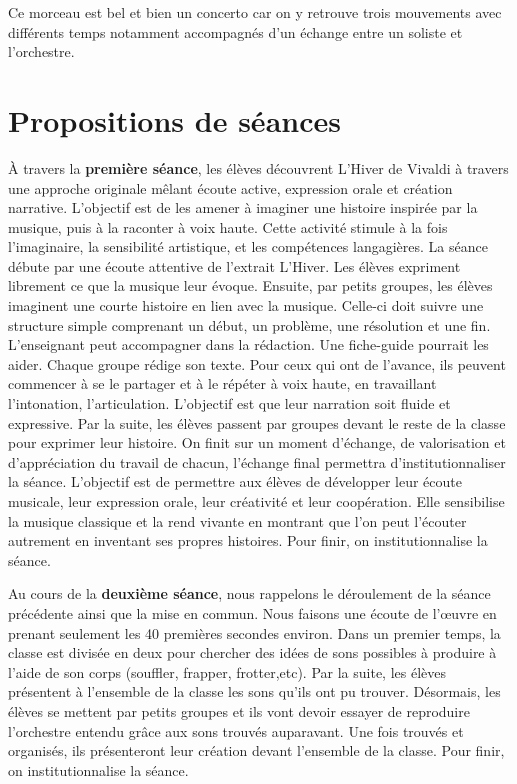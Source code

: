 \documentclass[12pt]{article}
\begin{document}
Ce morceau est bel et bien un concerto car on y retrouve trois mouvements avec différents temps notamment accompagnés d’un échange entre un soliste et l’orchestre.



\section{Propositions de séances}

À travers la \textbf{première séance}, les élèves découvrent L’Hiver de Vivaldi à travers une approche originale mêlant écoute active, expression orale et création narrative. L’objectif est de les amener à imaginer une histoire inspirée par la musique, puis à la raconter à voix haute. Cette activité stimule à la fois l’imaginaire, la sensibilité artistique, et les compétences langagières. 
La séance débute par une écoute attentive de l’extrait L’Hiver. Les élèves expriment librement ce que la musique leur évoque. Ensuite, par petits groupes, les élèves imaginent une courte histoire en lien avec la musique. Celle-ci doit suivre une structure simple comprenant un début, un problème, une résolution et une fin. L’enseignant peut accompagner dans la rédaction. Une fiche-guide pourrait les aider. Chaque groupe rédige son texte. Pour ceux qui ont de l’avance, ils peuvent commencer à se le partager et à le répéter à voix haute, en travaillant l’intonation, l’articulation. L’objectif est que leur narration soit fluide et expressive. Par la suite, les élèves passent par groupes devant le reste de la classe pour exprimer leur histoire. On finit sur un moment d’échange, de valorisation et d’appréciation du travail de chacun, l’échange final permettra d’institutionnaliser la séance. L’objectif est de permettre aux élèves de développer leur écoute musicale, leur expression orale, leur créativité et leur coopération. Elle sensibilise la musique classique et la rend vivante en montrant que l’on peut l’écouter autrement en inventant ses propres histoires. Pour finir, on institutionnalise la séance.

Au cours de la \textbf{deuxième séance}, nous rappelons le déroulement de la séance précédente ainsi que la mise en commun. Nous faisons une écoute de l’œuvre en prenant seulement les 40 premières secondes environ. Dans un premier temps, la classe est divisée en deux pour chercher des idées de sons possibles à produire à l’aide de son corps (souffler, frapper, frotter,etc). Par la suite, les élèves présentent à l’ensemble de la classe les sons qu’ils ont pu trouver. Désormais, les élèves se mettent par petits groupes et ils vont devoir essayer de reproduire l’orchestre entendu grâce aux sons trouvés auparavant. Une fois trouvés et organisés, ils présenteront leur création devant l’ensemble de la classe. Pour finir, on institutionnalise la séance.
\end{document}

